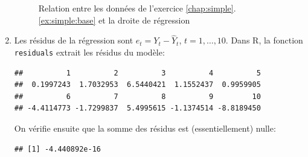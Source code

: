 \begin{solution}{2.1}
\begin{enumerate}
\begin{figure}
\begin{knitrout}
\end{knitrout}
        \caption{Relation entre les données de l'exercice
          \ref{chap:simple}.\ref{ex:simple:base} et la droite de
          régression}
        \label{fig:simple:base2}
      \end{figure}
    \item Les résidus de la régression sont $e_t = Y_t - \hat{Y}_t$,
      $t = 1, \dots, 10$. Dans \textsf{R}, la fonction
      \texttt{residuals} extrait les résidus du modèle:
\begin{knitrout}
\color{fgcolor}\begin{kframe}
\begin{alltt}
\end{alltt}
\begin{verbatim}
##          1          2          3          4          5
##  0.1997243  1.7032953  6.5440421  1.1552437  0.9959905
##          6          7          8          9         10
## -4.4114773 -1.7299837  5.4995615 -1.1374514 -8.8189450
\end{verbatim}
\end{kframe}
\end{knitrout}
      On vérifie ensuite que la somme des résidus est
      (essentiellement) nulle:
\begin{knitrout}
\color{fgcolor}\begin{kframe}
\begin{alltt}
\hlstd{(}
\end{alltt}
\begin{verbatim}
## [1] -4.440892e-16
\end{verbatim}
\end{kframe}
\end{knitrout}
    \end{enumerate}
  
\end{solution}

